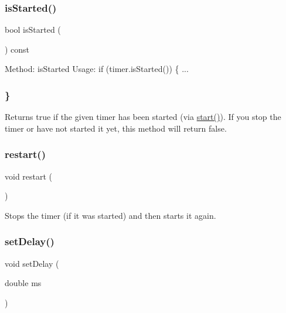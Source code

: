 \mbox{\label{classGTimer_ac1991ea0e286fbb461b60c8c9299d781}} 
\subsubsection{\texorpdfstring{is\+Started()}{isStarted()}}
{\footnotesize\ttfamily bool is\+Started (\begin{DoxyParamCaption}{ }\end{DoxyParamCaption}) const}



Method\+: is\+Started Usage\+: if (timer.\+is\+Started()) \{ ... 

\subsubsection*{\} }

Returns true if the given timer has been started (via \mbox{\hyperlink{classGTimer_a60de64d75454385b23995437f1d72669}{start()}}). If you stop the timer or have not started it yet, this method will return false. \mbox{\label{classGTimer_a22ee094ca3f45aa4156b97d34fe678bf}} 
\subsubsection{\texorpdfstring{restart()}{restart()}}
{\footnotesize\ttfamily void restart (\begin{DoxyParamCaption}{ }\end{DoxyParamCaption})}



Stops the timer (if it was started) and then starts it again. 

\mbox{\label{classGTimer_acebfcbc48c6acd460dac117a8f71a92f}} 
\subsubsection{\texorpdfstring{set\+Delay()}{setDelay()}}
{\footnotesize\ttfamily void set\+Delay (\begin{DoxyParamCaption}\item[{double}]{ms }\end{DoxyParamCaption})}



